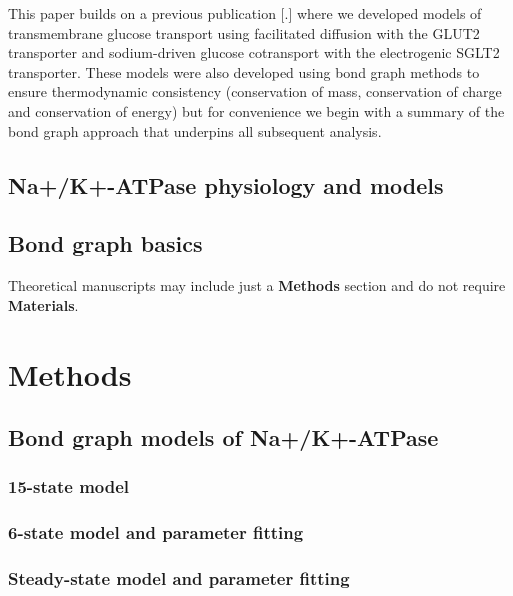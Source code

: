 \documentclass{biophys-new}
\begin{document}
This paper builds on a previous publication {[}.{]} where we developed
models of transmembrane glucose transport using facilitated diffusion
with the GLUT2 transporter and sodium-driven glucose cotransport with
the electrogenic SGLT2 transporter. These models were also developed
using bond graph methods to ensure thermodynamic consistency
(conservation of mass, conservation of charge and conservation of
energy) but for convenience we begin with a summary of the bond graph
approach that underpins all subsequent analysis.

\subsection*{Na+/K+-ATPase physiology and models}


\subsection*{Bond graph basics}

Theoretical manuscripts may include just a \textbf{Methods} section and do not require \textbf{Materials}.


\section*{Methods}


\subsection*{Bond graph models of Na+/K+-ATPase}

\subsubsection{15-state model}



\subsubsection{6-state model and parameter fitting}



\subsubsection{Steady-state model and parameter fitting}
\end{document}
